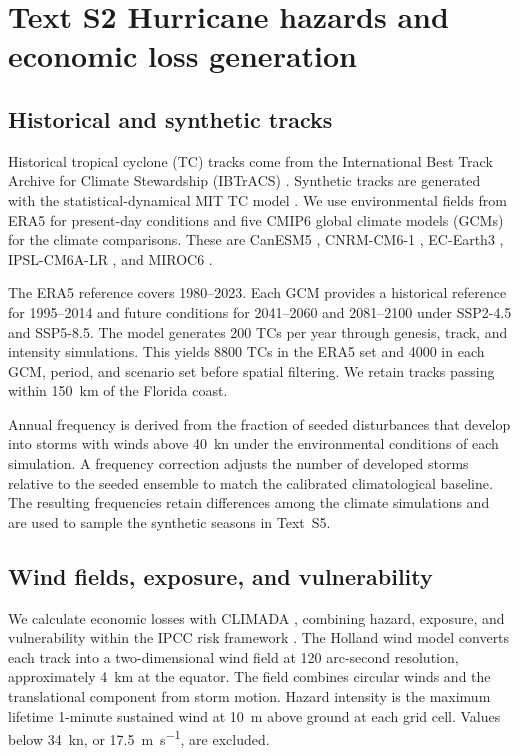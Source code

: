 \section*{Text S2 Hurricane hazards and economic loss generation}\label{TextS2}
\subsection*{Historical and synthetic tracks}\label{DataTCtracks}
Historical tropical cyclone (TC) tracks come from the International Best Track Archive for Climate Stewardship (IBTrACS) \cite{knapp_international_2010}. Synthetic tracks are generated with the statistical-dynamical MIT TC model \cite{emanuel_statistical_2006,emanuel_hurricanes_2008}. We use environmental fields from ERA5 for present-day conditions \cite{hersbach_era5_2020} and five CMIP6 global climate models (GCMs) for the climate comparisons. These are CanESM5 \cite{swart_canadian_2019}, CNRM-CM6-1 \cite{voldoire_evaluation_2019}, EC-Earth3 \cite{ec-earth-consortium_2019}, IPSL-CM6A-LR \cite{hourdin_lmdz6a_2020}, and MIROC6 \cite{tatebe_description_2019}.

The ERA5 reference covers 1980--2023. Each GCM provides a historical reference for 1995--2014 and future conditions for 2041--2060 and 2081--2100 under SSP2-4.5 and SSP5-8.5. The model generates 200 TCs per year through genesis, track, and intensity simulations. This yields \num{8800} TCs in the ERA5 set and \num{4000} in each GCM, period, and scenario set before spatial filtering. We retain tracks passing within \SI{150}{\kilo\meter} of the Florida coast.

Annual frequency is derived from the fraction of seeded disturbances that develop into storms with winds above \SI{40}{\knot} under the environmental conditions of each simulation. A frequency correction adjusts the number of developed storms relative to the seeded ensemble to match the calibrated climatological baseline. The resulting frequencies retain differences among the climate simulations and are used to sample the synthetic seasons in Text~S5.

\subsection*{Wind fields, exposure, and vulnerability}\label{MethodsHazModel}
We calculate economic losses with CLIMADA \cite{aznar-siguan_climada_2019}, combining hazard, exposure, and vulnerability within the IPCC risk framework \cite{ipcc_managing_2012}. The Holland wind model \cite{holland_revised_2008} converts each track into a two-dimensional wind field at 120 arc-second resolution, approximately \SI{4}{\kilo\meter} at the equator. The field combines circular winds and the translational component from storm motion. Hazard intensity is the maximum lifetime 1-minute sustained wind at \SI{10}{\meter} above ground at each grid cell. Values below \SI{34}{\knot}, or \SI{17.5}{\meter\per\second}, are excluded.

